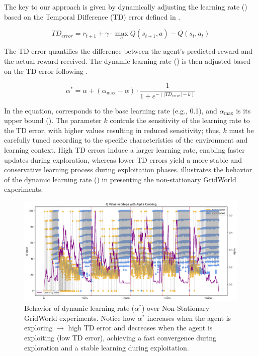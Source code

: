 The key to our approach is given by dynamically adjusting the learning rate (\lrate{\alpha}) based on 
the Temporal Difference (TD) error defined in .

\begin{equation} \label{eq:td_error}
    TD_{error} = r_{t+1} + \gamma \cdot \underset{a}{\max} Q(s_{t+1}, a) - Q(s_t, a_t)
\end{equation}

The TD error quantifies the difference between the agent’s predicted reward and the actual reward 
received. The dynamic learning rate (\lrate{\alpha^*}) is then adjusted based on the TD error following  
.

\begin{equation}
    \label{eq:dynamic_learning_rate}
    \alpha^* = \alpha + (\alpha_{\max}-\alpha) \cdot \frac{1}{1 + e^{-(|TD_{error}|-k)}}
\end{equation}

In the equation, \lrate{\alpha} corresponds to the base learning rate (e.g., 0.1), and $\alpha_{\max}$ is its upper bound (). The parameter $k$ controls the sensitivity of the learning rate to the TD error, with higher values resulting in reduced sensitivity; thus, $k$ must be carefully tuned according to the specific characteristics of the environment and learning context. High TD errors induce a larger learning rate, enabling faster updates during exploration, whereas lower TD errors yield a more stable and conservative learning process during exploitation phases.  illustrates the behavior of the dynamic learning rate (\lrate{\alpha^*}) in  presenting the non-stationary GridWorld experiments. 

\begin{figure}
    \centering
    \includegraphics[width=\textwidth]{figures/alpha.png}
    \caption{Behavior of dynamic learning rate ($\alpha^*$) over Non-Stationary GridWorld experiments. Notice how $\alpha^*$ increases when the agent is exploring $\rightarrow$ high TD error and decreases when the agent is exploiting (low TD error), achieving a fast convergence during exploration and a stable learning during exploitation.}
    \label{fig:alpha}
\end{figure}

